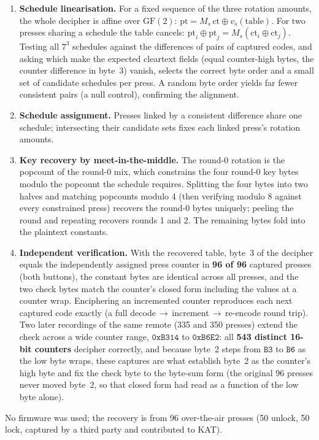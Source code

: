 \documentclass[11pt,a4paper]{article}
\begin{document}
\begin{enumerate}
\item \textbf{Schedule linearisation.} For a fixed sequence of the three rotation amounts, the whole decipher is affine over $\mathrm{GF}(2)$: $\mathrm{pt} = M_s\,\mathrm{ct} \oplus v_s(\text{table})$. For two presses sharing a schedule the table cancels: $\mathrm{pt}_i \oplus \mathrm{pt}_j = M_s(\mathrm{ct}_i \oplus \mathrm{ct}_j)$. Testing all $7^3$ schedules against the differences of pairs of captured codes, and asking which make the expected cleartext fields (equal counter-high bytes, the counter difference in byte~3) vanish, selects the correct byte order and a small set of candidate schedules per press. A random byte order yields far fewer consistent pairs (a null control), confirming the alignment.
\item \textbf{Schedule assignment.} Presses linked by a consistent difference share one schedule; intersecting their candidate sets fixes each linked press's rotation amounts.
\item \textbf{Key recovery by meet-in-the-middle.} The round-0 rotation is the popcount of the round-0 mix, which constrains the four round-0 key bytes modulo the popcount the schedule requires. Splitting the four bytes into two halves and matching popcounts modulo 4 (then verifying modulo 8 against every constrained press) recovers the round-0 bytes uniquely; peeling the round and repeating recovers rounds 1 and 2. The remaining bytes fold into the plaintext constants.
\item \textbf{Independent verification.} With the recovered table, byte~3 of the decipher equals the independently assigned press counter in \textbf{96 of 96} captured presses (both buttons), the constant bytes are identical across all presses, and the two check bytes match the counter's closed form including the values at a counter wrap. Enciphering an incremented counter reproduces each next captured code exactly (a full decode\,$\to$\,increment\,$\to$\,re-encode round trip). Two later recordings of the same remote (335 and 350 presses) extend the check across a wide counter range, $\mathtt{0xB314}$ to $\mathtt{0xB6E2}$: all \textbf{543 distinct 16-bit counters} decipher correctly, and because byte~2 steps from $\mathtt{B3}$ to $\mathtt{B6}$ as the low byte wraps, these captures are what establish byte~2 as the counter's high byte and fix the check byte to the byte-sum form (the original 96 presses never moved byte~2, so that closed form had read as a function of the low byte alone).
\end{enumerate}
No firmware was used; the recovery is from 96 over-the-air presses (50 unlock, 50 lock, captured by a third party and contributed to KAT).
\end{document}
